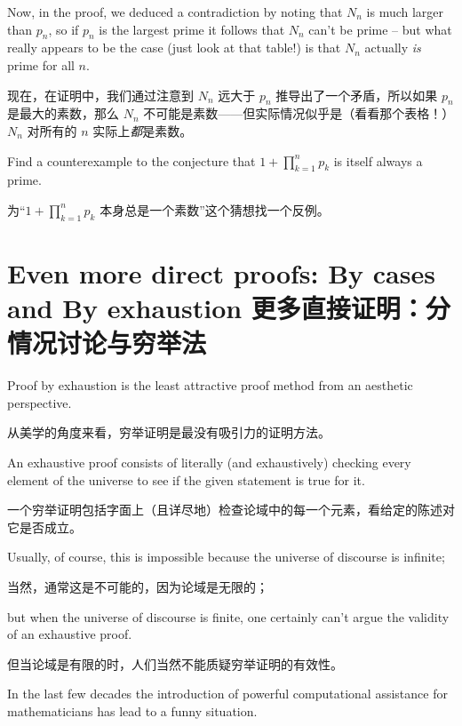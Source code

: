 Now, in the proof, we deduced a contradiction by noting that $N_n$ is
much larger than $p_n$, so if $p_n$ is the largest prime it follows that
$N_n$ can't be prime -- but what really appears to be the case (just look
at that table!) is that $N_n$ actually \emph{is} prime for all $n$.

现在，在证明中，我们通过注意到 $N_n$ 远大于 $p_n$ 推导出了一个矛盾，所以如果 $p_n$ 是最大的素数，那么 $N_n$ 不可能是素数——但实际情况似乎是（看看那个表格！）$N_n$ 对所有的 $n$ 实际上\emph{都}是素数。

\begin{exer}
      Find a counterexample to the conjecture that $1+\prod_{k=1}^n p_k$
      is itself always a prime.

      为“$1+\prod_{k=1}^n p_k$ 本身总是一个素数”这个猜想找一个反例。
\end{exer}


\clearpage





\newpage


\section[By cases and By exhaustion]{Even more direct proofs: By cases and By exhaustion 更多直接证明：分情况讨论与穷举法}
\label{sec:cases}

Proof by exhaustion is the least attractive proof method from
an aesthetic perspective.

从美学的角度来看，穷举证明是最没有吸引力的证明方法。

An exhaustive proof consists of literally
(and exhaustively) checking every element of the universe to see
if the given statement is true for it.

一个穷举证明包括字面上（且详尽地）检查论域中的每一个元素，看给定的陈述对它是否成立。

Usually, of course, this is
impossible because the universe of discourse is infinite;

当然，通常这是不可能的，因为论域是无限的；

but when the
universe of discourse is finite, one certainly can't argue the validity
of an exhaustive proof.

但当论域是有限的时，人们当然不能质疑穷举证明的有效性。

In the last few decades the introduction of powerful computational
assistance for mathematicians has lead to a funny situation.

